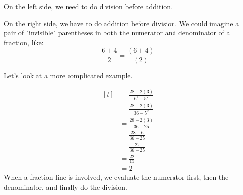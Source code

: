 On the left side, we need to do division before addition.

On the right side, we have to do addition before division. We could imagine a pair of "invisible" parentheses in both the numerator and denominator of a fraction, like:
\[ \frac{6+4}{2}=\frac{(6+4)}{(2)} \]

Let's look at a more complicated example.

\begin{myexample}
\[
\begin{aligned}[t]
   &\phantom{{}=} \frac{28-2(3)}{6^{2}-5^{2}} \\
   &= \frac{28-2(3)}{36-5^{2}} \\
   &= \frac{28-2(3)}{36-25} \\
   &= \frac{28-6}{36-25} \\
   &= \frac{22}{36-25} \\
   &= \frac{22}{11} \\
   &= 2
\end{aligned}
\]
When a fraction line is involved, we evaluate the numerator first, then the denominator, and finally do the division.
\end{myexample}

